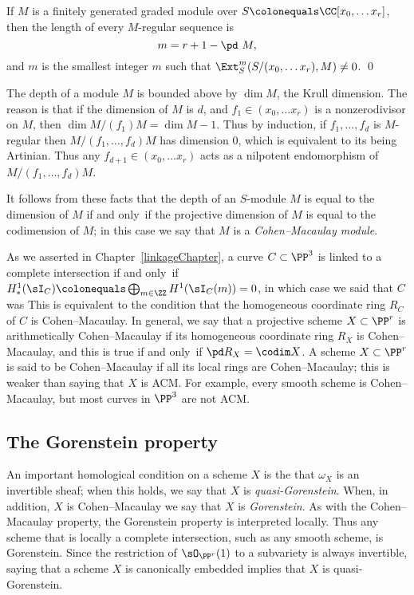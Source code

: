 \begin{theorem}\label{Auslander--Buchsbaum}
If $M$ is a finitely generated graded module
over $S \colonequals  \CC[x_0, \dots x_r]$,
then the length of every $M$-regular sequence is
$$m = r+1 - \pd\  M,$$
and $m$ is the smallest integer $m$ such that
$\Ext_S^m(S/(x_0, \dots x_r), M) \neq 0$.
%
\qed
\end{theorem}

The depth of a module $M$ is bounded above by $\dim M$, the Krull
dimension. The reason is that if the dimension of $M$
is $d$, and $f_1 \in (x_0, \dots x_r) $ is a nonzerodivisor on $M$,
then $\dim M/(f_1)M= \dim M-1$. Thus by induction, if
$f_1,\dots, f_d$ is $M$-regular then $M/(f_1, \dots, f_d)M$ has
dimension 0, which is equivalent to its being Artinian. Thus any
$ f_{d+1} \in(x_0, \dots x_r) $ acts as a nilpotent endomorphism of
$M/(f_1, \dots, f_d)M$.

It follows from these facts that the depth of an $S$-module $M$ is equal
to the dimension of $M$ if and only~if the projective dimension
of $M$ is equal to the codimension of $M$; in this case we say that $M$
is a
%
\emph{Cohen--Macaulay module}.

As we asserted in Chapter~\ref{linkageChapter}, a curve $C\subset \PP^3$
is linked to a complete intersection
if and only~if
$H^1_*(\sI_C) \colonequals  \bigoplus_{m\in \ZZ} H^1(\sI_C(m)) = 0$,
in which case we said that $C$ was
%
This is equivalent to the condition that the homogeneous coordinate
ring $R_{C}$ of $C$ is Cohen--Macaulay.
In general, we say that a projective scheme $X\subset \PP^{r}$
is arithmetically Cohen--Macaulay if its homogeneous coordinate ring $R_{X}$
is Cohen--Macaulay, and this is true
if and only~if $\pd R_X = \codim X$. A scheme $X\subset \PP^{r}$ is said to be Cohen--Macaulay
if all its local rings are Cohen--Macaulay; this is weaker  than saying that $X$ is ACM.
%
For example, every smooth scheme is Cohen--Macaulay, but most curves in $\PP^{3}$
are not ACM.

\subsection*{The Gorenstein property}
An important homological condition on a scheme $X$ is the that
$\omega_X$ is an invertible sheaf; when this holds, we say that $X$
is \emph{quasi-Gorenstein}. When, in addition, $X$ is Cohen--Macaulay
%
%
we say that $X$ is \emph{Gorenstein}. As with the Cohen--Macaulay property,
the Gorenstein property is interpreted locally.
Thus any scheme that is locally a
complete intersection, such as any smooth scheme, is Gorenstein. Since
the restriction
of $\sO_{\PP^r}(1)$ to a subvariety is always invertible, saying that
a scheme $X$ is canonically embedded implies that
$X$ is quasi-Gorenstein. 

